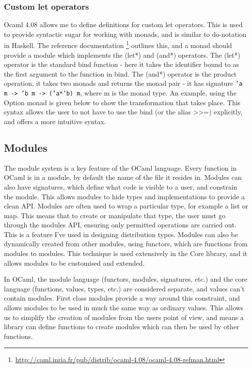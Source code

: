 \subsubsection{Custom let operators}
Ocaml 4.08 allows me to define definitions for custom let operators. This is used to provide syntactic sugar for working with monads, and is similar to do-notation in Haskell. The reference documentation \footnote{\url{http://caml.inria.fr/pub/distrib/ocaml-4.08/ocaml-4.08-refman.html}} outlines this, and a monad should provide a module which implements the (let*) and (and*) operators. The (let*) operator is the standard bind function - here it takes the identifier bound to as the first argument to the function in bind. The (and*) operator is the product operation, it takes two monads and returns the monad pair - it has signature \texttt{'a m -> 'b m -> ('a*'b) m}, where m is the monad type. An example, using the Option monad is given below to show the transformation that takes place. This syntax allows the user to not have to use the bind (or the alias >>=) explicitly, and offers a more intuitive syntax.


\subsection{Modules}
The module system is a key feature of the OCaml language. Every function in OCaml is in a module, by default the name of the file it resides in. Modules can also have signatures, which define what code is visible to a user, and constrain the module. This allows modules to hide types and implementations to provide a clean API. Modules are often used to wrap a particular type, for example a list or map. This means that to create or manipulate that type, the user must go through the modules API, ensuring only permitted operations are carried out. This is a feature I've used in designing distribution types. Modules can also be dynamically created from other modules, using functors, which are functions from modules to modules. This technique is used extensively in the Core library, and it allows modules to be customised and extended.

In OCaml, the module language (functors, modules, signatures, etc.) and the core language (functions, values, types, etc.) are considered separate, and values can't contain modules. First class modules provide a way around this constraint, and allows modules to be used in much the same way as ordinary values. This allows us to simplify the creation of modules from the users point of view, and means a library can define functions to create modules which can then be used by other functions.

